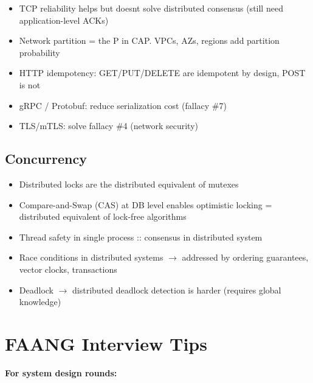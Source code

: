 \documentclass[11pt]{article}
\providecommand{\tightlist}{\setlength{\itemsep}{1pt}\setlength{\parskip}{0pt}}
\begin{document}
\begin{itemize}
\tightlist
\item
  TCP reliability helps but doesn\textquotesingle t solve distributed consensus (still need application-level ACKs)
\item
  Network partition = the P in CAP. VPCs, AZs, regions add partition probability
\item
  HTTP idempotency: GET/PUT/DELETE are idempotent by design, POST is not
\item
  gRPC / Protobuf: reduce serialization cost (fallacy \#7)
\item
  TLS/mTLS: solve fallacy \#4 (network security)
\end{itemize}

\subsection{Concurrency}\label{concurrency}

\begin{itemize}
\tightlist
\item
  Distributed locks are the distributed equivalent of mutexes
\item
  Compare-and-Swap (CAS) at DB level enables optimistic locking = distributed equivalent of lock-free algorithms
\item
  Thread safety in single process :: consensus in distributed system
\item
  Race conditions in distributed systems \(\rightarrow\) addressed by ordering guarantees, vector clocks, transactions
\item
  Deadlock \(\rightarrow\) distributed deadlock detection is harder (requires global knowledge)
\end{itemize}

\section{FAANG Interview Tips}\label{faang-interview-tips}

\textbf{For system design rounds:}
\end{document}
